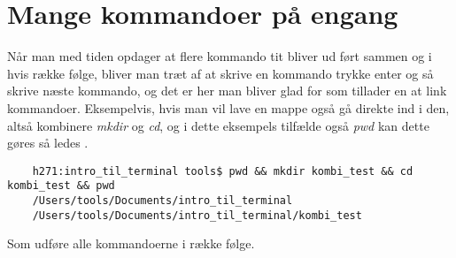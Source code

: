 \chapter{Mange kommandoer på engang}
Når man med tiden opdager at flere kommando tit bliver ud ført sammen og i hvis række følge, bliver man træt af at skrive en kommando trykke enter og så skrive næste kommando, og det er her man bliver glad for \text{&&} som tillader en at link kommandoer.
Eksempelvis, hvis man vil lave en mappe også gå direkte ind i den, altså kombinere \textit{mkdir} og \textit{cd}, og i dette eksempels tilfælde også \textit{pwd} kan dette gøres så ledes .
\begin{lstlisting}
	h271:intro_til_terminal tools$ pwd && mkdir kombi_test && cd kombi_test && pwd
	/Users/tools/Documents/intro_til_terminal
	/Users/tools/Documents/intro_til_terminal/kombi_test 
\end{lstlisting}
Som udføre alle kommandoerne i række følge. 
